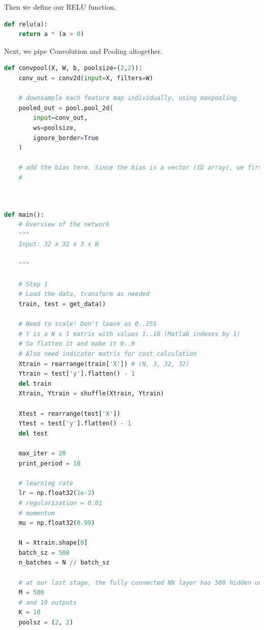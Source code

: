 \documentclass[fleqn,10pt]{olplainarticle}
\theoremstyle{definition}
\theoremstyle{remark}
\begin{document}
Then we define our RELU function.

\begin{lstlisting}[language=Python, caption=RELU]
def relu(a):
    return a * (a > 0)
\end{lstlisting}

Next, we pipe Convolution and Pooling altogether.

\begin{lstlisting}[language=Python, caption=Convolution and Pooling]
def convpool(X, W, b, poolsize=(2,2)):
    conv_out = conv2d(input=X, filters=W)
    
    # downsample each feature map individually, using maxpooling
    pooled_out = pool.pool_2d(
        input=conv_out,
        ws=poolsize,
        ignore_border=True
    )
    
    # add the bias term. Since the bias is a vector (1D array), we first
    # 
\end{lstlisting}

\begin{lstlisting}[language=Python, caption=Theano example]


def main():
    # Overview of the network
    """
    Input: 32 x 32 x 3 x N
    
    """
    
    # Step 1 
    # Load the data, transform as needed
    train, test = get_data()
    
    # Need to scale! Don't leave as 0..255
    # Y is a N x 1 matrix with values 1..10 (Matlab indexes by 1)
    # So flatten it and make it 0..9
    # Also need indicator matrix for cost calculation
    Xtrain = rearrange(train['X']) # (N, 3, 32, 32)
    Ytrain = test['y'].flatten() - 1
    del train
    Xtrain, Ytrain = shuffle(Xtrain, Ytrain)
    
    Xtest = rearrange(test['X'])
    Ytest = test['y'].flatten() - 1
    del test
    
    max_iter = 20
    print_period = 10
    
    # learning rate
    lr = np.float32(1e-2)
    # regularization = 0.01
    # momentum
    mu = np.float32(0.99)
    
    N = Xtrain.shape[0]
    batch_sz = 500
    n_batches = N // batch_sz
    
    # at our last stage, the fully connected NN layer has 500 hidden units
    M = 500
    # and 10 outputs
    K = 10
    poolsz = (2, 2)
    
    
\end{lstlisting}
\end{document}
